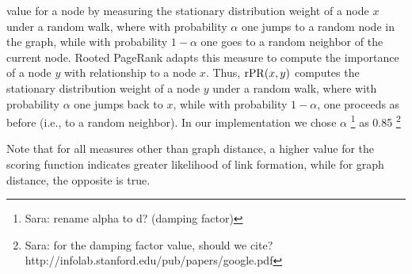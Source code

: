 \begin{itemize}
  value for a node by measuring the stationary distribution weight of
  a node $x$ under a random walk, where with probability $\alpha$ one
  jumps to a random node in the graph, while with probability
  $1-\alpha$ one goes to a random neighbor of the current node. Rooted
  PageRank adapts this measure to compute the importance of a node $y$
  with relationship to a node $x$. Thus, ${\mathrm {rPR}}(x,y)$ computes
  the stationary distribution weight of   a node $y$ under a random
  walk, where with probability $\alpha$ one jumps back to $x$, while
  with probability $1-\alpha$, one proceeds as before (i.e., to a
  random neighbor). In our implementation we chose $\alpha$ \footnote{Sara: rename alpha to d? (damping factor)} as
  0.85 \footnote{Sara: for the damping factor value, should we cite? http://infolab.stanford.edu/pub/papers/google.pdf} 
\end{itemize}
Note that for all measures other than graph distance, a
higher value for the scoring function indicates greater likelihood of
link formation, while for graph distance, the opposite is
true. 
